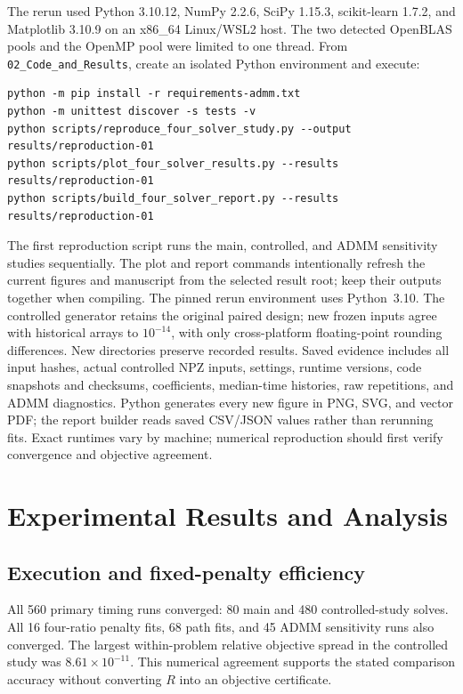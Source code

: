 \documentclass[10pt,letterpaper]{article}
\begin{document}
The rerun used Python 3.10.12, NumPy 2.2.6, SciPy 1.15.3, scikit-learn 1.7.2, and Matplotlib 3.10.9 on an x86\_64 Linux/WSL2 host. The two detected OpenBLAS pools and the OpenMP pool were limited to one thread. From \texttt{02\_Code\_and\_Results}, create an isolated Python environment and execute:
{\small
\begin{verbatim}
python -m pip install -r requirements-admm.txt
python -m unittest discover -s tests -v
python scripts/reproduce_four_solver_study.py --output results/reproduction-01
python scripts/plot_four_solver_results.py --results results/reproduction-01
python scripts/build_four_solver_report.py --results results/reproduction-01
\end{verbatim}
}
The first reproduction script runs the main, controlled, and ADMM sensitivity studies sequentially. The plot and report commands intentionally refresh the current figures and manuscript from the selected result root; keep their outputs together when compiling. The pinned rerun environment uses Python~3.10. The controlled generator retains the original paired design; new frozen inputs agree with historical arrays to $10^{-14}$, with only cross-platform floating-point rounding differences.
New directories preserve recorded results. Saved evidence includes all input hashes, actual controlled NPZ inputs, settings, runtime versions, code snapshots and checksums, coefficients, median-time histories, raw repetitions, and ADMM diagnostics. Python generates every new figure in PNG, SVG, and vector PDF; the report builder reads saved CSV/JSON values rather than rerunning fits. Exact runtimes vary by machine; numerical reproduction should first verify convergence and objective agreement.

\FloatBarrier
\section{Experimental Results and Analysis}
\subsection{Execution and fixed-penalty efficiency}
All 560 primary timing runs converged: 80 main and 480 controlled-study solves. All 16 four-ratio penalty fits, 68 path fits, and 45 ADMM sensitivity runs also converged. The largest within-problem relative objective spread in the controlled study was $8.61\times10^{-11}$. This numerical agreement supports the stated comparison accuracy without converting $R$ into an objective certificate.
\end{document}

